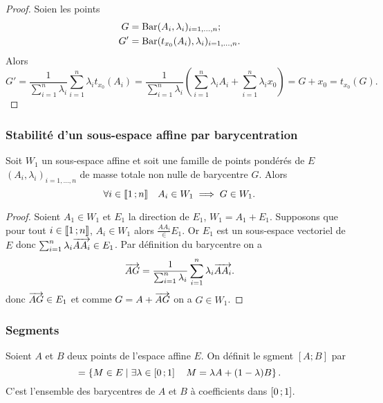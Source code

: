 \begin{proof}
  Soien les points
  \begin{align}
    G &= \operatorname{Bar}(A_i,\lambda_i)_{i=1,\ldots, n}; \\
    G' &=\operatorname{Bar}(t_{x_0}(A_i), \lambda_i)_{i=1, \ldots, n}.
  \end{align}
  Alors
  \begin{equation}
    G' = \frac{1}{\sum_{i=1}^n \lambda_i}{\sum_{i=1}^n \lambda_i t_{x_0}(A_i)} = \frac{1}{\sum_{i=1}^n \lambda_i} \left(\sum_{i=1}^n \lambda_i A_i + \sum_{i=1}^n \lambda_i x_0 \right) = G+x_0 = t_{x_0}(G).
\end{equation}
\end{proof}

\subsubsection{Stabilité d'un sous-espace affine par barycentration}

\begin{prop}
  Soit $W_1$ un sous-espace affine et soit une famille de points pondérés de $E$ $(A_i,\lambda_i)_{i=1, \ldots, n}$ de masse totale non nulle de barycentre $G$. Alors
  \begin{equation}
    \forall i \in \mathopen{\llbracket}1\mathclose{}\mathpunct{};n\mathclose{\rrbracket} \quad A_i \in W_1 \implies G \in W_1.
  \end{equation}
\end{prop}
\begin{proof}
  Soient $A_1 \in W_1$ et $E_1$ la direction de $E_1$, $W_1=A_1+E_1$. Supposons que pour tout $i \in \mathopen{\llbracket}1\mathclose{}\mathpunct{};n\mathclose{\rrbracket}$, $A_i \in W_1$ alors $\frac{AA_i} \in E_1$. Or $E_1$ est un sous-espace vectoriel de $E$ donc $\sum_{i=1}^n \lambda_i \overrightarrow{AA_i} \in E_1$. Par définition du barycentre on a
  \begin{equation}
    \overrightarrow{AG}=\frac{1}{\sum_{i=1}^n \lambda_i}\sum_{i=1}^n \lambda_i \overrightarrow{AA_i}.
  \end{equation}
  donc $\overrightarrow{AG} \in E_1$ et comme $G=A+\overrightarrow{AG}$ on a $G \in W_1$.
\end{proof}

\subsubsection{Segments}

\begin{defdef}
  Soient $A$ et $B$ deux points de l'espace affine $E$. On définit le sgment $[A;B]$ par
  \begin{equation}
    [A;B] = \enstq{M \in E}{\exists \lambda \in \intervalleff{0}{1} \quad  M = \lambda A+(1-\lambda)B}.
  \end{equation}
  C'est l'ensemble des barycentres de $A$ et $B$ à coefficients dans $\left[ 0 \, ;  1 \right]$.
\end{defdef}

